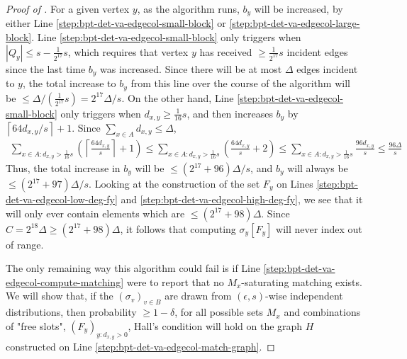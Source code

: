 \documentclass[10pt]{article}
\theoremstyle{definition}\newtheorem{definition}[lemma]{Definition}
\theoremstyle{remark}  \newtheorem*{remark}{Remark}
\newcommand{\ceil}[1]{{\left\lceil{#1}\right\rceil}}
\begin{document}
\begin{proof}[Proof of ]
  For a given vertex $y$, as the algorithm runs, $b_y$ will be increased, by either Line \ref{step:bpt-det-va-edgecol-small-block} or \ref{step:bpt-det-va-edgecol-large-block}. Line \ref{step:bpt-det-va-edgecol-small-block} only triggers when $|Q_y| \le s - \frac{1}{2^{17}} s$, which requires that vertex $y$ has received $\ge \frac{1}{2^{17}} s$ incident edges since the last time $b_y$ was increased. Since there will be at most $\Delta$ edges incident to $y$, the total increase to $b_y$ from this line over the course of the algorithm will be $\le \Delta / (\frac{1}{2^{17}} s) = 2^{17} \Delta / s$. On the other hand, Line \ref{step:bpt-det-va-edgecol-small-block} only triggers when $d_{x,y}\ge \frac{1}{16} s$, and then increases $b_y$ by $\ceil{64 d_{x,y} / s} + 1$. Since $\sum_{x \in A} d_{x,y} \le \Delta$,
  \begin{align*}
    \sum_{x \in A : d_{x,y} > \frac{1}{16} s} \left(\ceil{\frac{64 d_{x,y}}{s}} + 1\right)
    \le \sum_{x \in A : d_{x,y} > \frac{1}{16} s} \left(\frac{64 d_{x,y}}{s} + 2\right) \le \sum_{x \in A : d_{x,y} > \frac{1}{16} s} \frac{96 d_{x,y}}{s}  \le \frac{96 \Delta}{s}
  \end{align*}
  Thus, the total increase in $b_y$ will be $\le (2^{17}+96) \Delta / s$, and $b_y$ will always be $\le (2^{17}+97) \Delta / s$. Looking at the construction
  of the set $F_y$ on Lines \ref{step:bpt-det-va-edgecol-low-deg-fy} and \ref{step:bpt-det-va-edgecol-high-deg-fy}, we see that it will only ever contain elements which are $\le (2^{17}+98) \Delta$. Since $C = 2^{18} \Delta \ge (2^{17}+98) \Delta$, it follows that computing $\sigma_y[F_y]$ will never index out of range.
  
  The only remaining way this algorithm could fail is if Line \ref{step:bpt-det-va-edgecol-compute-matching}
  were to report that no $M_x$-saturating matching exists. We will show that, if the 
  $(\sigma_v)_{v \in B}$ are drawn from $(\epsilon,s)$-wise independent distributions,
  then probability $\ge 1 - \delta$, for all possible
  sets $M_x$ and combinations of "free slots", $(F_y)_{y : d_{x,y} >0}$, Hall's condition will
  hold on the graph $H$ constructed on Line \ref{step:bpt-det-va-edgecol-match-graph}.
  

\end{proof}
\end{document}
